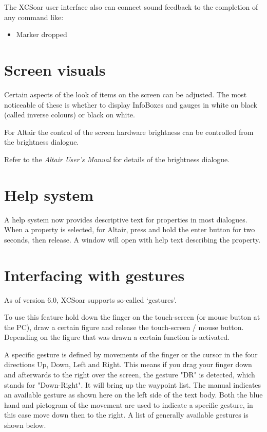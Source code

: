 The XCSoar user interface also can connect sound feedback to the completion 
of any command like:
\begin{itemize}
\item Marker dropped
\end{itemize}


\section{Screen visuals}

Certain aspects of the look of items on the screen can be adjusted.
The most noticeable of these is whether to display InfoBoxes and
gauges in white on black (called inverse colours) or black on white.

For Altair the control of the screen hardware 
brightness can be controlled from the brightness dialogue.
\begin{quote}
\blink{}
\end{quote}

Refer to the {\em Altair User's Manual} for details of the brightness
dialogue.


\section{Help system}

A help system now provides descriptive text for properties in
most dialogues.  When a property is selected, for Altair, press and hold the
enter button for two seconds, then release.  A window will open with
help text describing the property.

\section{Interfacing with gestures}\label{sec:gestures}
As of version 6.0, XCSoar supports so-called `gestures'.

To use this feature hold down the finger on the 
touch-screen (or mouse button at the PC), draw a certain figure and release 
the touch-screen / mouse button. Depending on the figure that was drawn 
a certain function is activated. 

A specific gesture is defined by movements of the finger or the 
cursor in the four directions Up, Down, Left and Right. This means if 
you drag your finger down and afterwards to the right over the screen, 
 the gesture "DR" is detected, which stands for "Down-Right". 
It will bring up the waypoint list. The manual indicates an available 
gesture as shown here on the left side of the text body. Both the blue hand 
and pictogram of the movement are used to indicate a specific gesture, in this 
case move down then to the right. A list of generally available gestures is 
shown below. 
\vspace{2em}

